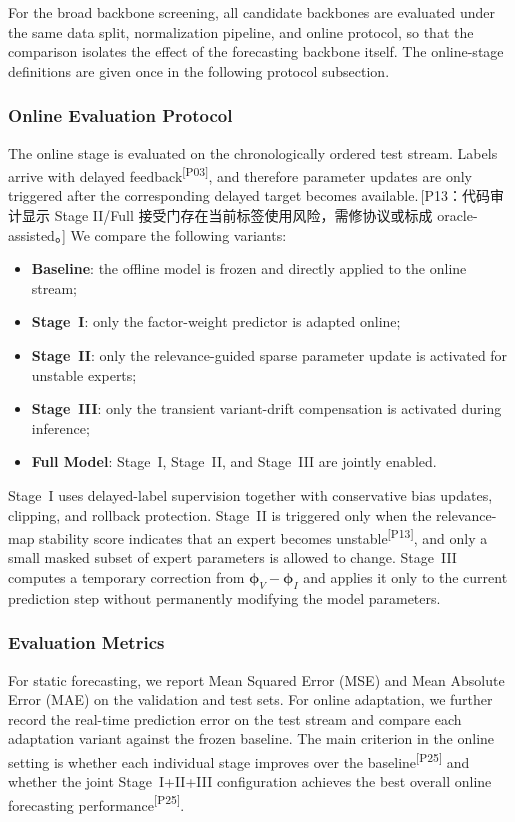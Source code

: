 ﻿\documentclass[journal]{IEEEtran}
\DeclareRobustCommand{\auditbad}[2]{{\color{auditred}#1}{\color{auditred}\textsuperscript{[#2]}}}
\DeclareRobustCommand{\auditnote}[2]{{\color{auditred}\footnotesize\,[#1：#2]}}
\begin{document}
For the broad backbone screening, all candidate backbones are evaluated under the same data split, normalization pipeline, and online protocol, so that the comparison isolates the effect of the forecasting backbone itself. The online-stage definitions are given once in the following protocol subsection.

\subsubsection{Online Evaluation Protocol}
The online stage is evaluated on the chronologically ordered test stream. Labels arrive with \auditbad{delayed feedback}{P03}, and therefore parameter updates are only triggered after the corresponding delayed target becomes available.\auditnote{P13}{代码审计显示 Stage II/Full 接受门存在当前标签使用风险，需修协议或标成 oracle-assisted。} We compare the following variants:
\begin{itemize}
\item \textbf{Baseline}: the offline model is frozen and directly applied to the online stream;
\item \textbf{Stage~I}: only the factor-weight predictor is adapted online;
\item \textbf{Stage~II}: only the relevance-guided sparse parameter update is activated for unstable experts;
\item \textbf{Stage~III}: only the transient variant-drift compensation is activated during inference;
\item \textbf{Full Model}: Stage~I, Stage~II, and Stage~III are jointly enabled.
\end{itemize}

Stage~I uses delayed-label supervision together with conservative bias updates, clipping, and rollback protection. \auditbad{Stage~II is triggered only when the relevance-map stability score indicates that an expert becomes unstable}{P13}, and only a small masked subset of expert parameters is allowed to change. Stage~III computes a temporary correction from $\boldsymbol{\phi}_V-\boldsymbol{\phi}_I$ and applies it only to the current prediction step without permanently modifying the model parameters.

\subsubsection{Evaluation Metrics}
For static forecasting, we report Mean Squared Error (MSE) and Mean Absolute Error (MAE) on the validation and test sets. For online adaptation, we further record the real-time prediction error on the test stream and compare each adaptation variant against the frozen baseline. The main criterion in the online setting is whether \auditbad{each individual stage improves over the baseline}{P25} and whether the joint Stage~I+II+III configuration achieves the \auditbad{best overall online forecasting performance}{P25}.
\end{document}
